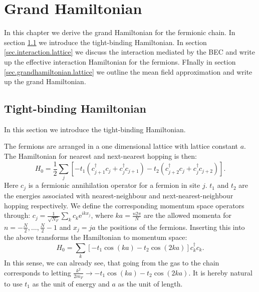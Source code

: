 
\chapter{Grand Hamiltonian} %

\label{Chapter12} %

In this chapter we derive the grand Hamiltonian for the fermionic chain. In section \ref{sec.TightbindingHam.lattice} we introduce the tight-binding Hamiltonian. In section \ref{sec.interaction.lattice} we discuss the interaction mediated by the BEC and write up the effective interaction Hamiltonian for the fermions. FInally in section \ref{sec.grandhamiltonian.lattice} we outline the mean field approximation and write up the grand Hamiltonian. 

\section{Tight-binding Hamiltonian} \label{sec.TightbindingHam.lattice}
In this section we introduce the tight-binding Hamiltonian. 

The fermions are arranged in a one dimensional lattice with lattice constant $a$. The Hamiltonian for nearest and next-nearest hopping is then:
\begin{equation}
H_{0} = \frac{1}{2}\sum_{j} \left[- t_1(c^\dagger_{j+1}c_j + c^\dagger_j c_{j + 1}) - t_2(c^\dagger_{j + 2}c_j + c^\dagger_j c_{j + 2}) \right].
\label{eq.Htightbindingrealspace} 
\end{equation}
Here $c_j$ is a fermionic annihilation operator for a fermion in site $j$. $t_1$ and $t_2$ are the energies associated with nearest-neighbour and next-nearest-neighbour hopping respectively. We define the corresponding momentum space operators through: $c_j = \frac{1}{\sqrt{N_F}}\sum_{k} c_k \text{e}^{ikx_j}$, where $ka = \frac{n2\pi}{N}$ are the allowed momenta for $n = -\frac{N}{2}, \dots, \frac{N}{2} - 1$ and $x_j = ja$ the positions of the fermions. Inserting this into the above transforms the Hamiltonian to momentum space:
\begin{equation}
H_{0} = \sum_k \left[ - t_1\cos(ka) - t_2\cos(2ka)\right]c^\dagger_kc_k.
\label{eq.Htightbindingmomentumspace} 
\end{equation}
In this sense, we can already see, that going from the gas to the chain corresponds to letting $\frac{k^2}{2m_F} \to - t_1\cos(ka) - t_2\cos(2ka)$. It is hereby natural to use $t_1$ as the unit of energy and $a$ as the unit of length.

